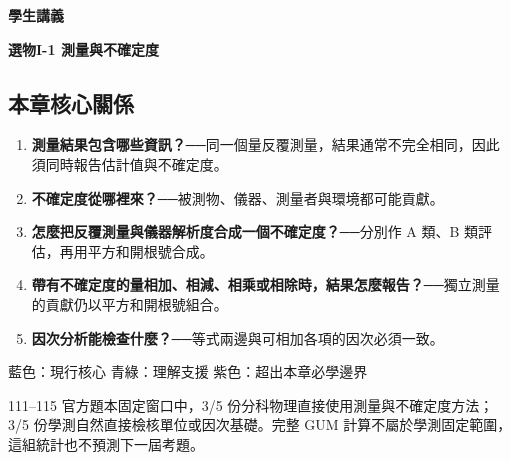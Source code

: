 \documentclass[11pt,a4paper]{article}
\providecommand{\tightlist}{%
  \setlength{\itemsep}{0pt}\setlength{\parskip}{0pt}}
\begin{document}
\begin{tcolorbox}[
  enhanced,colback=white,colframe=HandoutBlue,boxrule=1.1pt,arc=2mm,
  borderline west={3pt}{0pt}{HandoutBlue},left=5mm,right=4mm,top=4mm,bottom=4mm
]
{\sffamily\small\bfseries\color{HandoutBlue}學生講義}\par
{\sffamily\bfseries\LARGE\color{HandoutInk}選物I-1 測量與不確定度}\par
\vspace{0.35em}{\large 測量結果由估計值與不確定度共同構成}\par
{}\par
{}\par
\end{tcolorbox}


\begin{HandoutLearningMap}

\subsection{本章核心關係}\label{ux672cux7ae0ux6838ux5fc3ux95dcux4fc2}

\begin{enumerate}
\def\labelenumi{\arabic{enumi}.}
\tightlist
\item
  \textbf{測量結果包含哪些資訊？}──同一個量反覆測量，結果通常不完全相同，因此須同時報告估計值與不確定度。
\item
  \textbf{不確定度從哪裡來？}──被測物、儀器、測量者與環境都可能貢獻。
\item
  \textbf{怎麼把反覆測量與儀器解析度合成一個不確定度？}──分別作 A 類、B 類評估，再用平方和開根號合成。
\item
  \textbf{帶有不確定度的量相加、相減、相乘或相除時，結果怎麼報告？}──獨立測量的貢獻仍以平方和開根號組合。
\item
  \textbf{因次分析能檢查什麼？}──等式兩邊與可相加各項的因次必須一致。
\end{enumerate}

{藍色：現行核心}
{青綠：理解支援}
{紫色：超出本章必學邊界}

111--115 官方題本固定窗口中，3/5 份分科物理直接使用測量與不確定度方法；3/5 份學測自然直接檢核單位或因次基礎。完整 GUM 計算不屬於學測固定範圍，這組統計也不預測下一屆考題。

\end{HandoutLearningMap}
\end{document}
